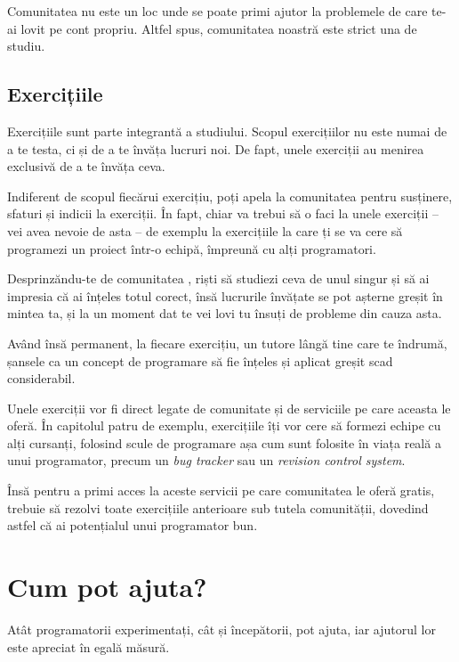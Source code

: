 Comunitatea {\phpro} nu este un loc unde se poate primi ajutor la problemele de
care te-ai lovit pe cont propriu. Altfel spus, comunitatea noastră este strict
una de studiu.

\subsection*{Exercițiile}
{}

Exercițiile sunt parte integrantă a studiului. Scopul exercițiilor nu este numai
de a te testa, ci și de a te învăța lucruri noi. De fapt, unele exerciții au
menirea exclusivă de a te învăța ceva.

Indiferent de scopul fiecărui exercițiu, poți apela la comunitatea {\phpro}
pentru susținere, sfaturi și indicii la exerciții. În fapt, chiar va trebui să
o faci la unele exerciții -- vei avea nevoie de asta -- de exemplu la
exercițiile la care ți se va cere să programezi un proiect într-o echipă,
împreună cu alți programatori.

Desprinzăndu-te de comunitatea {\phpro}, riști să studiezi ceva de unul singur
și să ai impresia că ai înțeles totul corect, însă lucrurile învățate se pot
așterne greșit în mintea ta, și la un moment dat te vei lovi tu însuți de
probleme din cauza asta.

Având însă permanent, la fiecare exercițiu, un tutore lângă tine care te
îndrumă, șansele ca un concept de programare să fie înțeles și aplicat
greșit scad considerabil.

Unele exerciții vor fi direct legate de comunitate și de serviciile pe care
aceasta le oferă. În capitolul patru de exemplu, exercițiile îți vor cere să
formezi echipe cu alți cursanți, folosind scule de programare așa cum sunt
folosite în viața reală a unui programator, precum un \textsl{bug tracker} sau
un \textsl{revision control system}.

Însă pentru a primi acces la aceste servicii pe care comunitatea {\phpro} le
oferă gratis, trebuie să rezolvi toate exercițiile anterioare sub tutela
comunității, dovedind astfel că ai potențialul unui programator bun.

\section*{Cum pot ajuta?}
{}

Atât programatorii experimentați, cât și începătorii, pot ajuta, iar ajutorul
lor este apreciat în egală măsură.

